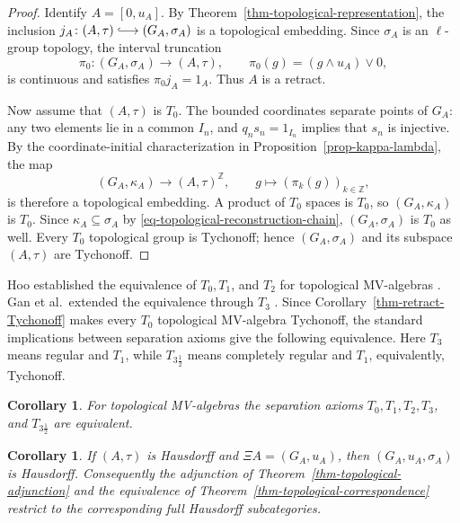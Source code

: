 \documentclass[preprint,3p]{elsarticle}
\theoremstyle{plain}
\newtheorem{cor}[thm]{Corollary}
\theoremstyle{definition}
\newcommand{\longhookrightarrow}{\lhook\joinrel\longrightarrow}
\numberwithin{equation}{section}
\begin{document}
\begin{proof}
Identify $A=[0,u_A]$.  By
Theorem~\ref{thm-topological-representation}, the inclusion
$j_A\colon(A,\tau)\longhookrightarrow(G_A,\sigma_A)$ is a
topological embedding.  Since $\sigma_A$ is an $\ell$-group topology,
the interval truncation
\[
 \pi_0\colon(G_A,\sigma_A)\longrightarrow(A,\tau),
 \qquad \pi_0(g)=(g\wedge u_A)\vee0,
\]
is continuous and satisfies $\pi_0j_A=1_A$.  Thus $A$ is a retract.

Now assume that $(A,\tau)$ is $T_0$.  The bounded coordinates
separate points of $G_A$: any two elements lie in a common $I_n$,
and $q_ns_n=1_{I_n}$ implies that $s_n$ is injective.
By the coordinate-initial characterization in
Proposition~\ref{prop-kappa-lambda}, the map
\[
 (G_A,\kappa_A)\longrightarrow(A,\tau)^{\mathbb Z},
 \qquad g\mapsto(\pi_k(g))_{k\in\mathbb Z},
\]
is therefore a topological embedding.  A product of $T_0$ spaces
is $T_0$, so $(G_A,\kappa_A)$ is $T_0$.
Since $\kappa_A\subseteq\sigma_A$ by
\eqref{eq-topological-reconstruction-chain}, $(G_A,\sigma_A)$ is
$T_0$ as well.  Every $T_0$ topological group is Tychonoff;
hence $(G_A,\sigma_A)$ and its subspace $(A,\tau)$ are Tychonoff.
\end{proof}

Hoo established the equivalence of $T_0,T_1$, and $T_2$ for
topological MV-algebras \cite{Hoo1997}.
Gan et al.\ extended the equivalence through $T_3$ \cite{Gan2024}.
Since Corollary~\ref{thm-retract-Tychonoff} makes every $T_0$
topological MV-algebra Tychonoff, the standard implications between
separation axioms give the following equivalence.
Here $T_3$ means regular and $T_1$, while $T_{3\frac12}$ means
completely regular and $T_1$, equivalently, Tychonoff.

\begin{cor}
\label{cor-separation-axioms}
For topological MV-algebras the separation axioms
$T_0,T_1,T_2,T_3$, and $T_{3\frac12}$ are equivalent.
\end{cor}

\begin{cor}
\label{cor-Hausdorff-adjunction}
If $(A,\tau)$ is Hausdorff and $\Xi A=(G_A,u_A)$, then
$(G_A,u_A,\sigma_A)$ is Hausdorff.
Consequently the adjunction of Theorem~\ref{thm-topological-adjunction}
and the equivalence of Theorem~\ref{thm-topological-correspondence}
restrict to the corresponding full Hausdorff subcategories.
\end{cor}
\end{document}
